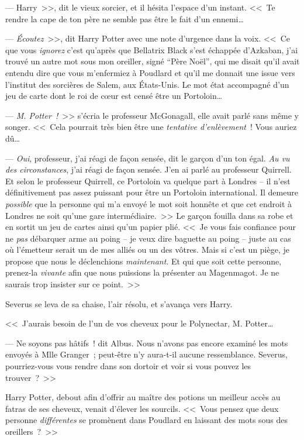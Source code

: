 --- Harry~>>, dit le vieux sorcier, et il hésita l'espace d'un instant. <<~Te rendre la cape de ton père ne semble pas être le fait d'un ennemi…

--- \emph{Écoutez}~>>, dit Harry Potter avec une note d'urgence dans la voix. <<~Ce que vous \emph{ignorez} c'est qu'après que Bellatrix Black s'est échappée d'Azkaban, j'ai trouvé un autre mot sous mon oreiller, signé “Père Noël”, qui me disait qu'il avait entendu dire que vous m'enfermiez à Poudlard et qu'il me donnait une issue vers l'institut des sorcières de Salem, aux États-Unis. Le mot état accompagné d'un jeu de carte dont le roi de cœur est censé être un Portoloin…

--- \emph{M. Potter~!}~>> s'écria le professeur McGonagall, elle avait parlé sans même y songer. <<~Cela pourrait très bien être une \emph{tentative d'enlèvement}~! Vous auriez dû…

--- \emph{Oui}, professeur, j'ai réagi de façon sensée, dit le garçon d'un ton égal. \emph{Au vu des circonstances}, j'ai réagi de façon sensée. J'en ai parlé au professeur Quirrell. Et selon le professeur Quirrell, ce Portoloin va quelque part à Londres -- il n'est définitivement pas assez puissant pour être un Portoloin international. Il demeure \emph{possible} que la personne qui m'a envoyé le mot soit honnête et que cet endroit à Londres ne soit qu'une gare intermédiaire.~>> Le garçon fouilla dans sa robe et en sortit un jeu de cartes ainsi qu'un papier plié. <<~Je vous fais confiance pour ne \emph{pas} débarquer arme au poing -- je veux dire baguette au poing -- juste au cas où l'émetteur serait un de mes alliés ou un des vôtres. Mais si c'est un piège, je propose que nous le déclenchions \emph{maintenant}. Et qui que soit cette personne, prenez-la \emph{vivante} afin que nous puissions la présenter au Magenmagot. Je ne saurais trop insister sur ce point.~>>

Severus se leva de sa chaise, l'air résolu, et s'avança vers Harry.

<<~J'aurais besoin de l'un de vos cheveux pour le Polynectar, M. Potter…

--- Ne soyons pas hâtifs~! dit Albus. Nous n'avons pas encore examiné les mots envoyés à Mlle Granger~; peut-être n'y aura-t-il aucune ressemblance. Severus, pourriez-vous vous rendre dans son dortoir et voir si vous pouvez les trouver~?~>>

Harry Potter, debout afin d'offrir au maître des potions un meilleur accès au fatras de ses cheveux, venait d'élever les sourcils. <<~Vous pensez que deux personne \emph{différentes} se promènent dans Poudlard en laissant des mots sous des oreillers~?~>>

